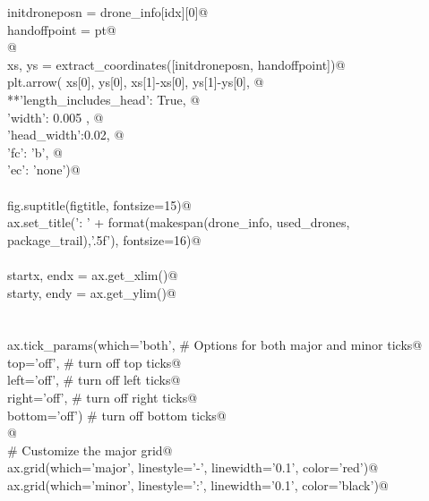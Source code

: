 \documentclass[10pt, english, oneside]{report}
\begin{document}
\begin{appendices}
\begin{flushleft}
\begin{list}{}{}
\mbox{}\verb@         initdroneposn = drone_info[idx][0]@\\
\mbox{}\verb@         handoffpoint  = pt@\\
\mbox{}\verb@    @\\
\mbox{}\verb@         xs, ys = extract_coordinates([initdroneposn, handoffpoint])@\\
\mbox{}\verb@         plt.arrow( xs[0], ys[0], xs[1]-xs[0], ys[1]-ys[0], @\\
\mbox{}\verb@                    **{'length_includes_head': True, @\\
\mbox{}\verb@                       'width': 0.005 , @\\
\mbox{}\verb@                       'head_width':0.02, @\\
\mbox{}\verb@                       'fc': 'b', @\\
\mbox{}\verb@                       'ec': 'none'})@\\
\mbox{}\verb@@\\
\mbox{}\verb@    fig.suptitle(figtitle, fontsize=15)@\\
\mbox{}\verb@    ax.set_title('\nMakespan: ' + format(makespan(drone_info, used_drones, package_trail),'.5f'), fontsize=16)@\\
\mbox{}\verb@@\\
\mbox{}\verb@    startx, endx = ax.get_xlim()@\\
\mbox{}\verb@    starty, endy = ax.get_ylim()@\\
\mbox{}\verb@@\\
\mbox{}\verb@@\\
\mbox{}\verb@    ax.tick_params(which='both', # Options for both major and minor ticks@\\
\mbox{}\verb@                top='off', # turn off top ticks@\\
\mbox{}\verb@                left='off', # turn off left ticks@\\
\mbox{}\verb@                right='off',  # turn off right ticks@\\
\mbox{}\verb@                bottom='off') # turn off bottom ticks@\\
\mbox{}\verb@    @\\
\mbox{}\verb@    # Customize the major grid@\\
\mbox{}\verb@    ax.grid(which='major', linestyle='-', linewidth='0.1', color='red')@\\
\mbox{}\verb@    ax.grid(which='minor', linestyle=':', linewidth='0.1', color='black')@\\

\end{list}
\end{flushleft}
\end{appendices}
\end{document}
